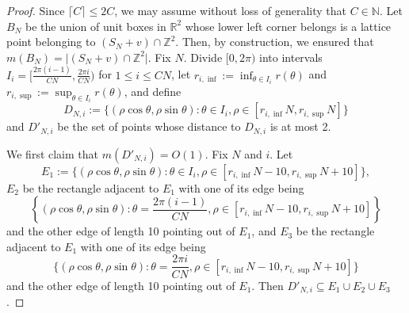 \documentclass[11pt]{amsart}
\theoremstyle{definition}
\newcommand{\N}{{\mathbb N}}
\newcommand{\R}{{\mathbb R}}
\newcommand{\Z}{{\mathbb Z}}
\newcommand{\FM}[1]{{\color{violet}{{#1}}}}
\begin{document}
 \begin{proof}

      
   
     Since $\lceil C\rceil\leq 2C$, we may assume without loss of generality that $C\in\N$.
      Let $B_{N}$ be the union of unit boxes in $\R^{2}$ whose lower left corner belongs is a lattice point belonging to $(S_{N}+v)\cap \Z^{2}$. Then, by construction, we ensured that $m(B_{N})=\vert(S_{N}+v)\cap \Z^{2}\vert$. Fix $N$. Divide $[0,2\pi)$ into intervals $I_{i}=[\frac{2\pi(i-1)}{CN},\frac{2\pi i}{CN})$
for $1\leq i\leq CN$, let $r_{i,\inf}:=\inf_{\theta\in I_{i}}r(\theta)$ and $r_{i,\sup}:=\sup_{\theta\in I_{i}}r(\theta)$, and define 
$$D_{N,i}:=\{(\rho\cos \theta,\rho\sin\theta)\colon \theta\in I_{i}, \rho\in [r_{i,\inf}N,r_{i,\sup}N]\}$$
and $D'_{N,i}$ be the set of points whose distance to $D_{N,i}$ is at most 2.

We first claim that $m(D'_{N,i})=O(1)$.
Fix $N$ and $i$. Let $$E_{1}:=\{(\rho\cos \theta,\rho\sin\theta)\colon \theta\in I_{i}, \rho\in [r_{i,\inf}N-10,r_{i,\sup}N+10]\},$$
$E_{2}$ be the rectangle adjacent to $E_{1}$ with one of its edge being $$\left\{(\rho\cos \theta,\rho\sin\theta)\colon \theta=\frac{2\pi (i-1)}{CN}, \rho\in [r_{i,\inf}N-10,r_{i,\sup}N+10]\right\}$$  and the other edge of length 10 pointing out of $E_{1}$, and $E_{3}$ be the rectangle adjacent to $E_{1}$ with one of its edge being $$\{(\rho\cos \theta,\rho\sin\theta)\colon \theta=\frac{2\pi i}{CN}, \rho\in [r_{i,\inf}N-10,r_{i,\sup}N+10]\}$$  and the other edge of length 10 pointing out of $E_{1}$. Then $D'_{N,i}\subseteq E_{1}\cup E_{2}\cup E_{3}$.


\end{proof}
\end{document}
